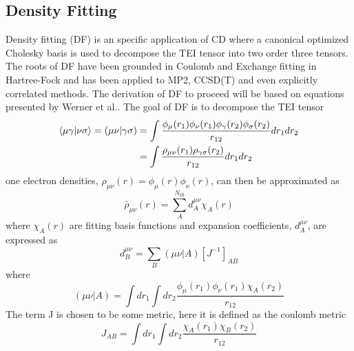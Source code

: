 	\subsection{Density Fitting}
		Density fitting (DF) is an specific application of CD where a canonical optimized Cholesky basis is used to decompose the TEI tensor into two order three tensors. The roots of DF have been grounded in Coulomb\cite{Ten-no1995,Vahtras1993} and Exchange\cite{Weigend2002} fitting in Hartree-Fock and has been applied to MP2\cite{Feyereisen1993}, CCSD(T)\cite{Rendell1994} and even explicitly correlated methods\cite{Manby2003}. The derivation of DF to proceed will be based on equations presented by Werner et al.\cite{Werner2003}. The goal of DF is to decompose the TEI tensor
			\begin{equation}
				\begin{aligned}
			\langle\mu\gamma|\nu\sigma\rangle = (\mu\nu|\gamma\sigma) &= \int\frac{\phi_\mu(r_1) \phi_\nu(r_1) \phi_\gamma(r_2)\phi_\sigma(r_2)}{r_{12}} dr_1 dr_2\\
			&= \int \frac{\rho_{\mu\nu}(r_1)\rho_{\gamma\sigma}(r_2)}{r_{12}}dr_1 dr_2
				\end{aligned}
			\end{equation}
		one electron densities, $\rho_{\mu\nu}(r) = \phi_\mu(r) \phi_\nu(r)$, can then be approximated as 
			\begin{equation}
				\bar{\rho}_{\mu\nu}(r) = \sum_A^{N_{\text{fit}}} d^{\mu\nu}_A \chi_A(r)
			\end{equation}
		where $\chi_A(r)$ are fitting basis functions and expansion coefficients, $d^{\mu\nu}_A$, are expressed as %
			\begin{equation}
				d^{\mu\nu}_B = \sum_B (\mu\nu|A)[J^{-1}]_{AB}
			\end{equation}
		where 
			\begin{equation}
				(\mu\nu|A) = \int dr_1 \int dr_2 \frac{\phi_\mu(r_1)\phi_\nu(r_1)\chi_A(r_2)}{r_{12}}
			\end{equation}
		The term J is chosen to be some metric, here it is defined as the coulomb metric\cite{Dunlap1977,Dunlap1979}
			\begin{equation}
				J_{AB} = \int dr_1 \int dr_2 \frac{\chi_A(r_1) \chi_B(r_2)}{r_{12}}
			\end{equation}
